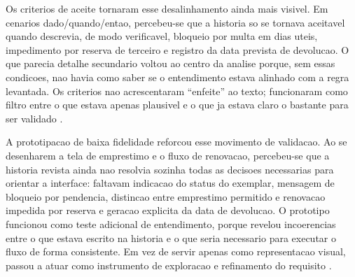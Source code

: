 \documentclass[12pt]{article}
\begin{document}
%
Os criterios de aceite tornaram esse desalinhamento ainda mais visivel. Em cenarios dado/quando/entao, percebeu-se que a historia so se tornava aceitavel quando descrevia, de modo verificavel, bloqueio por multa em dias uteis, impedimento por reserva de terceiro e registro da data prevista de devolucao. O que parecia detalhe secundario voltou ao centro da analise porque, sem essas condicoes, nao havia como saber se o entendimento estava alinhado com a regra levantada. Os criterios nao acrescentaram ``enfeite'' ao texto; funcionaram como filtro entre o que estava apenas plausivel e o que ja estava claro o bastante para ser validado \cite{hickey2004unified,lucassen2016qus}.

%
A prototipacao de baixa fidelidade reforcou esse movimento de validacao. Ao se desenharem a tela de emprestimo e o fluxo de renovacao, percebeu-se que a historia revista ainda nao resolvia sozinha todas as decisoes necessarias para orientar a interface: faltavam indicacao do status do exemplar, mensagem de bloqueio por pendencia, distincao entre emprestimo permitido e renovacao impedida por reserva e geracao explicita da data de devolucao. O prototipo funcionou como teste adicional de entendimento, porque revelou incoerencias entre o que estava escrito na historia e o que seria necessario para executar o fluxo de forma consistente. Em vez de servir apenas como representacao visual, passou a atuar como instrumento de exploracao e refinamento do requisito \cite{filipovic2021mockups}.
\end{document}
